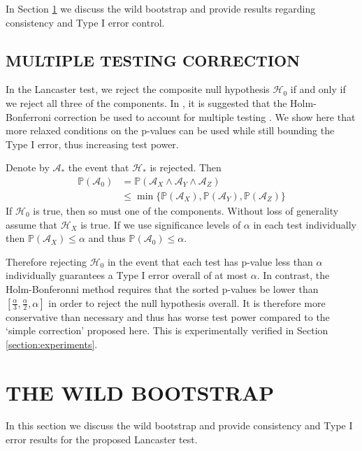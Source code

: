 \documentclass[]{article}
\begin{document}
In Section \ref{section:details} we discuss the wild bootstrap and provide results regarding consistency and Type I error control.

\subsection{MULTIPLE TESTING CORRECTION}
In the Lancaster test, we reject the composite null hypothesis $\mathcal{H}_0$ if and only if we reject all three of the components. In \citet{sejdinovic2013kernel}, it is suggested that the Holm-Bonferroni correction be used to account for multiple testing \citep{holm1979simple}. We show here that more relaxed conditions on the p-values can be used while still bounding the Type I error, thus increasing test power.

Denote by $\mathcal{A}_*$ the event that $\mathcal{H}_*$ is rejected. Then
\begin{align*}
\mathbb{P}(\mathcal{A}_0) &= \mathbb{P}(\mathcal{A}_X \land \mathcal{A}_Y \land \mathcal{A}_Z) \\
&\leq \min\{\mathbb{P}(\mathcal{A}_X), \mathbb{P}(\mathcal{A}_Y), \mathbb{P}(\mathcal{A}_Z)\}
\end{align*}
If $\mathcal{H}_0$ is true, then so must one of the components. Without loss of generality assume that $\mathcal{H}_X$ is true. If we use significance levels of $\alpha$ in each test individually then $\mathbb{P}(\mathcal{A}_X) \leq \alpha$ and thus $\mathbb{P}(\mathcal{A}_0) \leq \alpha$.

Therefore rejecting $\mathcal{H}_0$ in the event that each test has p-value less than $\alpha$ individually guarantees a Type I error overall of at most $\alpha$. In contrast, the Holm-Bonferonni method requires that the sorted p-values be lower than $[\frac{\alpha}{3},\frac{\alpha}{2},\alpha]$ in order to reject the null hypothesis overall. It is therefore more conservative than necessary and thus has worse test power compared to the `simple correction' proposed here. This is experimentally verified in Section \ref{section:experiments}.



\section{THE WILD BOOTSTRAP}\label{section:details}

In this section we discuss the wild bootstrap and provide consistency and Type I error results for the proposed Lancaster test.
\end{document}

